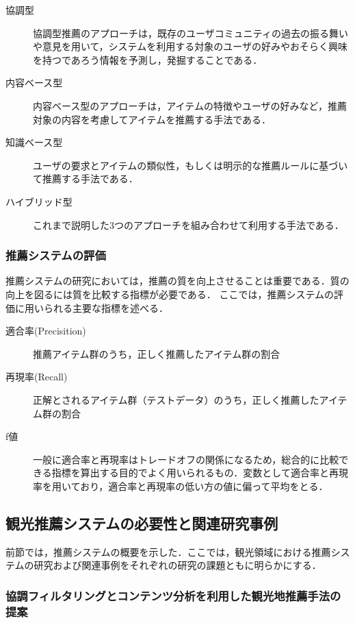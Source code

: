 \documentclass{jsarticle}
\begin{document}
\begin{description}
\item[協調型] 協調型推薦のアプローチは，既存のユーザコミュニティの過去の振る舞いや意見を用いて，システムを利用する対象のユーザの好みやおそらく興味を持つであろう情報を予測し，発掘することである．
\item[内容ベース型] 内容ベース型のアプローチは，アイテムの特徴やユーザの好みなど，推薦対象の内容を考慮してアイテムを推薦する手法である．
\item[知識ベース型] ユーザの要求とアイテムの類似性，もしくは明示的な推薦ルールに基づいて推薦する手法である．
\item[ハイブリッド型] これまで説明した3つのアプローチを組み合わせて利用する手法である．
\end{description}

\subsubsection{推薦システムの評価}

推薦システムの研究においては，推薦の質を向上させることは重要である．質の向上を図るには質を比較する指標が必要である．
ここでは，推薦システムの評価に用いられる主要な指標を述べる．

\begin{description}
\item[適合率(Precisition)] 推薦アイテム群のうち，正しく推薦したアイテム群の割合
\item[再現率(Recall)]  正解とされるアイテム群（テストデータ）のうち，正しく推薦したアイテム群の割合
\item[f値]  一般に適合率と再現率はトレードオフの関係になるため，総合的に比較できる指標を算出する目的でよく用いられるもの．変数として適合率と再現率を用いており，適合率と再現率の低い方の値に偏って平均をとる．
\end{description}

\subsection{観光推薦システムの必要性と関連研究事例}

前節では，推薦システムの概要を示した．ここでは，観光領域における推薦システムの研究および関連事例をそれぞれの研究の課題ともに明らかにする．

\subsubsection{協調フィルタリングとコンテンツ分析を利用した観光地推薦手法の提案}
\end{document}
